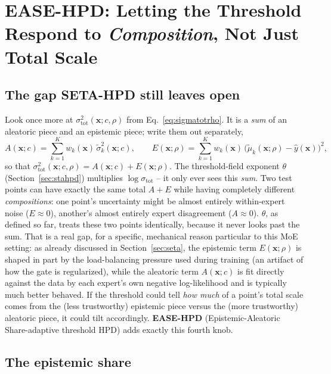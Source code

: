 \documentclass[11pt]{article}
\begin{document}
\section{EASE-HPD: Letting the Threshold Respond to \emph{Composition}, Not Just Total Scale}
\label{sec:ease}

\subsection{The gap SETA-HPD still leaves open}

Look once more at $\sigma_{\mathrm{tot}}^2(\bm x;c,\rho)$ from Eq.~\eqref{eq:sigmatotrho}. It is a
\emph{sum} of an aleatoric piece and an epistemic piece; write them out separately,
\begin{equation}
A(\bm x;c) = \sum_{k=1}^K w_k(\bm x)\,\tilde\sigma_k^2(\bm x;c), \qquad
E(\bm x;\rho) = \sum_{k=1}^K w_k(\bm x)\,\big(\tilde\mu_k(\bm x;\rho) - \hat y(\bm x)\big)^2,
\label{eq:aeterms}
\end{equation}
so that $\sigma_{\mathrm{tot}}^2(\bm x;c,\rho) = A(\bm x;c) + E(\bm x;\rho)$. The threshold-field
exponent $\theta$ (Section~\ref{sec:stahpd}) multiplies $\log\sigma_{\mathrm{tot}}$ -- it only ever
sees this \emph{sum}. Two test points can have exactly the same total $A+E$ while having
completely different \emph{compositions}: one point's uncertainty might be almost entirely
within-expert noise ($E\approx0$), another's almost entirely expert disagreement ($A\approx0$).
$\theta$, as defined so far, treats these two points identically, because it never looks past the
sum. That is a real gap, for a specific, mechanical reason particular to this MoE setting: as
already discussed in Section~\ref{sec:seta}, the epistemic term $E(\bm x;\rho)$ is shaped in part
by the load-balancing pressure used during training (an artifact of how the gate is regularized),
while the aleatoric term $A(\bm x;c)$ is fit directly against the data by each expert's own
negative log-likelihood and is typically much better behaved. If the threshold could tell \emph{how
much} of a point's total scale comes from the (less trustworthy) epistemic piece versus the (more
trustworthy) aleatoric piece, it could tilt accordingly. \textbf{EASE-HPD} (Epistemic-Aleatoric
Share-adaptive threshold HPD) adds exactly this fourth knob.

\subsection{The epistemic share}
\end{document}
